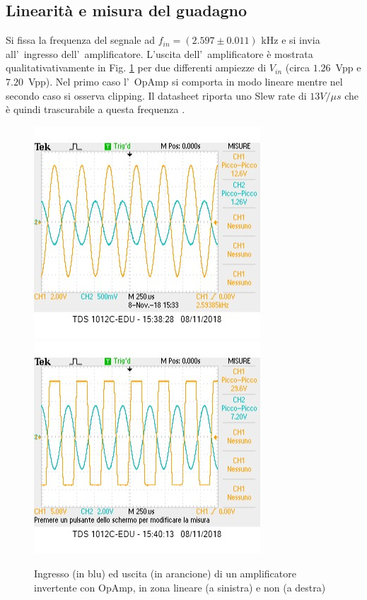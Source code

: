 \documentclass[10pt,a4paper]{article}
\begin{document}
	\subsection{Linearit\`a e misura del guadagno}
	Si fissa la frequenza del segnale ad $f_{in} = (2.597 \pm 0.011)$ kHz e si invia all'~ingresso dell'~amplificatore.	L'uscita dell'~amplificatore \`e mostrata qualitativativamente in Fig. \ref{fig:oscinv} per due 
	differenti ampiezze di $V_{in}$ (circa $1.26$~Vpp e $7.20$~Vpp). 
	Nel primo caso l'~OpAmp si comporta in modo lineare mentre nel secondo caso si osserva clipping. Il datasheet riporta uno Slew rate di $13 V/\mu s$ che è quindi trascurabile a questa frequenza .
	\begin{figure}[h]
		\begin{center}
		
			\includegraphics[scale=0.7]{foto1.jpg}
			\includegraphics[scale=0.7]{foto2.jpg}
			\label{fig:oscinv}
			
		\end{center}

		\caption{\small Ingresso (in blu) ed uscita (in arancione) di un amplificatore invertente con OpAmp, in 
			zona lineare (a sinistra) e non (a destra)}

	\end{figure}
	
\end{document}

